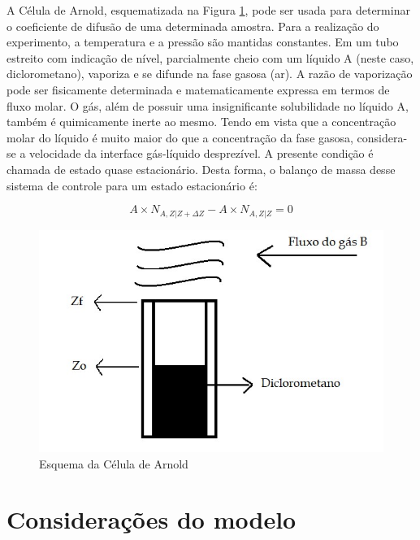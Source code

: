 A Célula de Arnold, esquematizada na Figura \ref{apaTeo}, pode ser usada para determinar o coeficiente de difusão de uma determinada amostra. Para a realização do experimento, a temperatura e a pressão são mantidas constantes. Em um tubo estreito com indicação de nível, parcialmente cheio com um líquido A (neste caso, diclorometano), vaporiza e se difunde na fase gasosa (ar). A razão de vaporização pode ser fisicamente determinada e matematicamente expressa em termos de fluxo molar. O gás, além de possuir uma insignificante solubilidade no líquido A, também é quimicamente inerte ao mesmo.
Tendo em vista que a concentração molar do líquido é muito maior do que a concentração da fase gasosa, considera-se a velocidade da interface gás-líquido desprezível. A presente condição é chamada de estado quase estacionário. Desta forma, o balanço de massa desse sistema de controle para um estado estacionário é:

\begin{equation}\label{key}
A \times N_{A, Z|Z+\Delta Z}-A \times N_{A, Z | Z}=0
\end{equation}

\begin{figure}[H]
	\begin{center}
		\includegraphics[scale=0.6,trim={0 0 0 0}]{figuras/ladeq/difusao/aparatoTeo}
		\caption{Esquema da Célula de Arnold}
		\label{apaTeo}
	\end{center}
\end{figure}



\section{Considerações do modelo}



